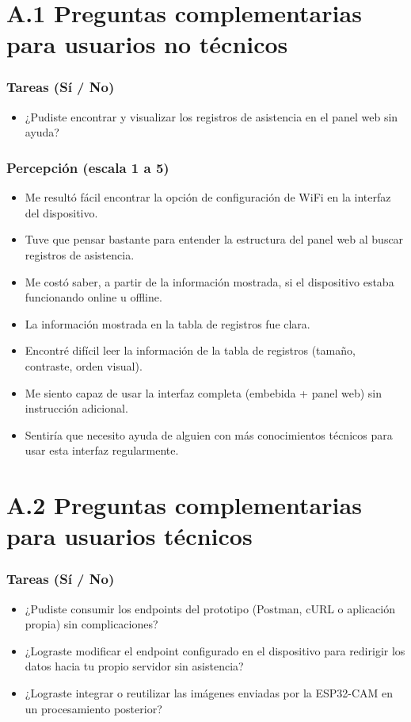 \documentclass{iccmemoria}
\begin{document}
\section*{A.1 Preguntas complementarias para usuarios no técnicos}

\subsubsection*{Tareas (Sí / No)}
\begin{itemize}
    \item ¿Pudiste encontrar y visualizar los registros de asistencia en el panel web sin ayuda?
\end{itemize}

\subsubsection*{Percepción (escala 1 a 5)}
\begin{itemize}
    \item Me resultó fácil encontrar la opción de configuración de WiFi en la interfaz del dispositivo.
    \item Tuve que pensar bastante para entender la estructura del panel web al buscar registros de asistencia.
    \item Me costó saber, a partir de la información mostrada, si el dispositivo estaba funcionando online u offline.
    \item La información mostrada en la tabla de registros fue clara.
    \item Encontré difícil leer la información de la tabla de registros (tamaño, contraste, orden visual).
    \item Me siento capaz de usar la interfaz completa (embebida + panel web) sin instrucción adicional.
    \item Sentiría que necesito ayuda de alguien con más conocimientos técnicos para usar esta interfaz regularmente.
\end{itemize}

\section*{A.2 Preguntas complementarias para usuarios técnicos}

\subsubsection*{Tareas (Sí / No)}
\begin{itemize}
    \item ¿Pudiste consumir los endpoints del prototipo (Postman, cURL o aplicación propia) sin complicaciones?
    \item ¿Lograste modificar el endpoint configurado en el dispositivo para redirigir los datos hacia tu propio servidor sin asistencia?
    \item ¿Lograste integrar o reutilizar las imágenes enviadas por la ESP32-CAM en un procesamiento posterior?
\end{itemize}
\end{document}
